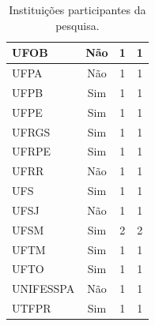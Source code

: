 \begin{table}[]
{\begin{tabular}{|l|c|c|c|}
UFOB                                                               & Não                  & 1                               & 1                          \\ \hline
UFPA                                                               & Não                  & 1                               & 1                          \\ \hline
UFPB                                                               & Sim                  & 1                               & 1                          \\ \hline
UFPE                                                               & Sim                  & 1                               & 1                          \\ \hline
UFRGS                                                              & Sim                  & 1                               & 1                          \\ \hline
UFRPE                                                              & Sim                  & 1                               & 1                          \\ \hline
UFRR                                                               & Não                  & 1                               & 1                          \\ \hline
UFS                                                                & Sim                  & 1                               & 1                          \\ \hline
UFSJ                                                               & Não                  & 1                               & 1                          \\ \hline
UFSM                                                               & Sim                  & 2                               & 2                          \\ \hline
UFTM                                                               & Sim                  & 1                               & 1                          \\ \hline
UFTO                                                               & Sim                  & 1                               & 1                          \\ \hline
UNIFESSPA                                                          & Não                  & 1                               & 1                          \\ \hline
UTFPR                                                              & Sim                  & 1                               & 1                          \\ \hline
\end{tabular}%
}
\caption{Instituições participantes da pesquisa.}
\label{tabela:resumoColeta}
\end{table}

